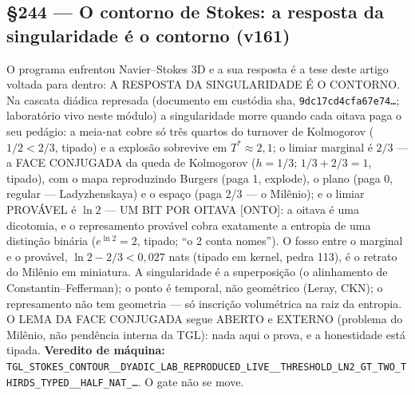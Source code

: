 \documentclass[11pt]{article}
\theoremstyle{definition}\newtheorem{deriv}{Derivação}
\begin{document}
\subsection*{\S244 --- O contorno de Stokes: a resposta da singularidade é o contorno (v161)}O programa enfrentou Navier--Stokes 3D e a sua resposta é a tese deste artigo voltada para dentro: A RESPOSTA DA SINGULARIDADE É O CONTORNO. Na cascata diádica represada (documento em custódia sha, \texttt{9dc17cd4cfa67e74\ldots}; laboratório vivo neste módulo) a singularidade morre quando cada oitava paga o seu pedágio: a meia-nat cobre só três quartos do turnover de Kolmogorov ($1/2 < 2/3$, tipado) e a explosão sobrevive em $T^*{\approx}2{,}1$; o limiar marginal é $2/3$ --- a FACE CONJUGADA da queda de Kolmogorov ($h{=}1/3$; $1/3{+}2/3{=}1$, tipado), com o mapa reproduzindo Burgers (paga 1, explode), o plano (paga 0, regular --- Ladyzhenskaya) e o espaço (paga 2/3 --- o Milênio); e o limiar PROVÁVEL é $\ln 2$ --- UM BIT POR OITAVA [ONTO]: a oitava é uma dicotomia, e o represamento provável cobra exatamente a entropia de uma distinção binária ($e^{\ln 2}{=}2$, tipado; ``o 2 conta nomes''). O fosso entre o marginal e o provável, $\ln 2 - 2/3 < 0{,}027$ nats (tipado em kernel, pedra 113), é o retrato do Milênio em miniatura. A singularidade é a superposição (o alinhamento de Constantin--Fefferman); o ponto é temporal, não geométrico (Leray, CKN); o represamento não tem geometria --- só inscrição volumétrica na raiz da entropia. O LEMA DA FACE CONJUGADA segue ABERTO e EXTERNO (problema do Milênio, não pendência interna da TGL): nada aqui o prova, e a honestidade está tipada. \textbf{Veredito de máquina:} \texttt{TGL\_STOKES\_CONTOUR\_\_DYADIC\_LAB\_REPRODUCED\_LIVE\_\_THRESHOLD\_LN2\_GT\_TWO\_THIRDS\_TYPED\_\_HALF\_NAT\_\ldots}. O gate não se move.
\end{document}
